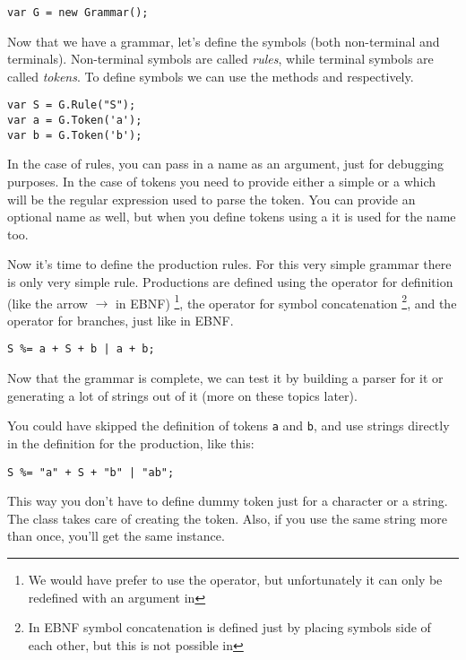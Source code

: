 \begin{verbatim}
var G = new Grammar();
\end{verbatim}

Now that we have a grammar, let's define the symbols (both non-terminal and terminals).
Non-terminal symbols are called \emph{rules}, while terminal symbols are called \emph{tokens}.
To define symbols we can use the methods 
and  respectively.

\begin{verbatim}
var S = G.Rule("S");
var a = G.Token('a');
var b = G.Token('b');
\end{verbatim}

In the case of rules, you can pass in a name as an argument, just for debugging
purposes. In the case of tokens you need to provide either a simple 
or a  which will be the regular expression used to parse
the token. You can provide an optional name as well, but when you define
tokens using a  it is used for the name too.

Now it's time to define the production rules. For this very simple grammar there
is only very simple rule.
Productions are defined using the \code{\%=} operator
for definition (like the arrow $\rightarrow$ in EBNF)
\footnote{We would have prefer to use the \code{>>} operator, but unfortunately 
it can only be redefined with an  argument in \cs}, the \code{+} operator
for symbol concatenation
\footnote{In EBNF symbol concatenation is defined just by placing symbols
side of each other, but this is not possible in \cs}, 
and the \code{|} operator for branches, just like in EBNF.

\begin{verbatim}
S %= a + S + b | a + b;
\end{verbatim}

Now that the grammar is complete, we can test it by building a parser for it
or generating a lot of strings out of it (more on these topics later).

You could have skipped the definition of tokens \verb|a| and \verb|b|,
and use strings directly in the definition for the production, like this:

\begin{verbatim}
S %= "a" + S + "b" | "ab";
\end{verbatim}

This way you don't have to define dummy token just for a character or
a string. The  class
takes care of creating the token. Also, if you use the same string more than once,
you'll get the same  instance.